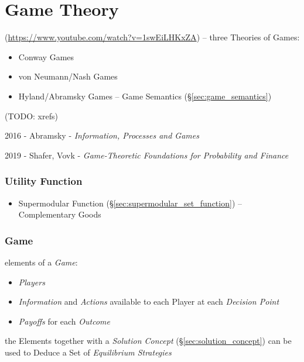 \part{Game Theory}\label{sec:game_theory}

(\url{https://www.youtube.com/watch?v=1swEiLHKxZA}) -- three Theories of Games:
\begin{itemize}
  \item Conway Games
  \item von Neumann/Nash Games
  \item Hyland/Abramsky Games -- Game Semantics (\S\ref{sec:game_semantics})
\end{itemize}
(TODO: xrefs)

2016 - Abramsky - \emph{Information, Processes and Games}

2019 - Shafer, Vovk
- \emph{Game-Theoretic Foundations for Probability and Finance}



\section{Utility Function}\label{sec:utility_function}


\begin{itemize}
  \item Supermodular Function (\S\ref{sec:supermodular_set_function}) --
    Complementary Goods
\end{itemize}



\section{Game}\label{sec:game}

elements of a \emph{Game}:
\begin{itemize}
  \item \emph{Players}
  \item \emph{Information} and \emph{Actions} available to each Player at each
    \emph{Decision Point}
  \item \emph{Payoffs} for each \emph{Outcome}
\end{itemize}
the Elements together with a \emph{Solution Concept}
(\S\ref{sec:solution_concept}) can be used to Deduce a Set of \emph{Equilibrium
  Strategies}

